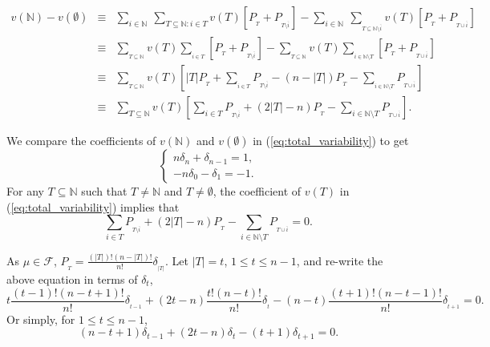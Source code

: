 \documentclass[a4paper,12pt]{article}
\begin{document}
\begin{equation}\label{eq:total_variability}\tag{A.2}
\begin{array}{rcl}
v(\mathbb{N})-v(\emptyset)
&\equiv&\sum\limits_{i\in \mathbb{N}} \ \sum\limits_{T\subseteq \mathbb{N}: i \in T}v(T)[P_{_T} + P_{_{T\setminus \overline{i}}}] 
	- \sum\limits_{i\in \mathbb{N}} \ \sum\limits_{_{T\subseteq \mathbb{N}\setminus \overline{i}}}v(T)[P_{_T} + P_{_{T\cup \overline{i}}}]\\

&\equiv&\sum\limits_{_{T\subseteq \mathbb{N}}} v(T) \sum\limits_{_{i\in T}}[P_{_T} + P_{_{T\setminus \overline{i}}}]
		- \sum\limits_{_{T\subseteq \mathbb{N}}} v(T) \sum\limits_{_{i \in \mathbb{N} \setminus T}}[P_{_T} + P_{_{T\cup \overline{i}}}]\\

&\equiv&\sum\limits_{_{T\subseteq \mathbb{N}}} v(T) \left [|T| P_{_T} + \sum\limits_{_{i\in T}} P_{_{T\setminus \overline{i}}}
			- (n-|T|)P_{_T} - \sum\limits_{_{i\in \mathbb{N} \setminus T}} P_{_{T\cup \overline{i}}} \right ]\\

&\equiv& \sum\limits_{T\subseteq \mathbb{N}} v(T) \left [ \sum\limits_{i\in T} P_{_{T\setminus \overline{i}}} + (2|T|-n)P_{_T}
			- \sum\limits_{i \in \mathbb{N} \setminus T} P_{_{T\cup \overline{i}}} \right ].
\end{array}		
\end{equation}

We compare the coefficients of $v(\mathbb{N})$ and $v(\emptyset)$ in (\ref{eq:total_variability}) to get
\begin{equation}\label{eq:total_value}\tag{A.3}
\left \{
\begin{array}{l}
n\delta_n + \delta_{n-1} = 1, \\
-n\delta_0 - \delta_1  = -1.
\end{array}
\right .
\end{equation}
For any $T\subseteq \mathbb{N}$ such that $T\not = \mathbb{N}$ and $T \not = \emptyset$, the coefficient of
$v(T)$ in (\ref{eq:total_variability}) implies that
$$
\sum\limits_{i\in T}P_{_{T\setminus \overline{i}}} + (2|T|-n) P_{_T} - \sum\limits_{i \in \mathbb{N} \setminus T}P_{_{T\cup \overline{i}}} = 0.
$$

As $\mu \in \mathscr{F}$, $P_{_T} = \frac{(|T|)!(n-|T|)!}{n!} \delta_{_{|T|}}$.
Let $|T|=t$,  $1\le t \le n-1$, and re-write the above equation in terms of $\delta_t$,
$$
t  \frac{(t-1)! (n-t+1)!}{n!} \delta_{_{t-1}}
+ (2t-n) \frac{t! (n-t)!}{n!} \delta_{_t}
- (n-t)   \frac{(t+1)! (n-t-1)!}{n!} \delta_{_{t+1}} 
= 0.
$$
Or simply, for $1\le t \le n-1$,
\begin{equation}\label{eq:adjacentXt}\tag{A.4}
(n-t+1)\delta_{t-1} + (2t-n) \delta_t - (t+1)\delta_{t+1} =0.
\end{equation}
\end{document}
